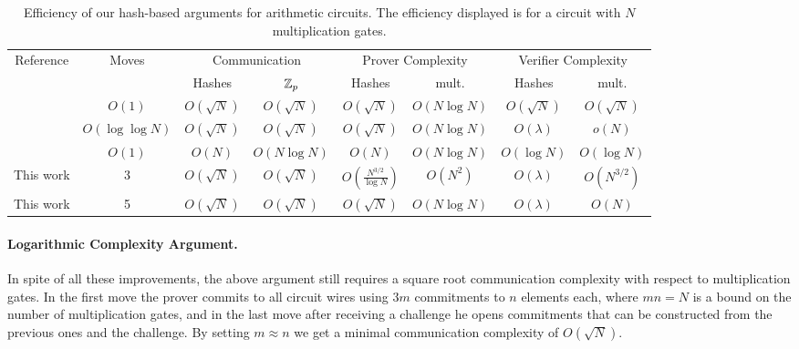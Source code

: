 \begin{table}
\vspace{20mm}
\centering
\begin{tabular}{|c|c|cc|cc|cc|}
\hline
Reference & Moves &\multicolumn{2}{c|}{ Communication}&\multicolumn{2}{c|}{Prover Complexity}&\multicolumn{2}{c|}{Verifier Complexity}\\
&& Hashes & $\mathbb{Z}_p$ & Hashes & mult. & Hashes & mult. \\
\hline
\cite{CCS:AHIV17}& $O(1)$& $O(\sqrt{N})$  & $O(\sqrt{N})$ & $O(\sqrt{N})$ & $O(N\log N)$& $O(\sqrt{N})$ & $O(\sqrt{N})$ \\
\cite{BootleCGGHJ17}& $O(\log \log N)$ &$O(\sqrt{N})$&$O(\sqrt{N})$&$O(\sqrt{N})$ &$O\left(N \log N\right)$&$O(\lambda)$&$o(N)$ \\
\cite{Ben-SassonBHR18}& $O(1)$ &$O(N)$&$O(N \log N)$&$O(N)$ & $O(N \log N)$ &  $O(\log N)$&$O(\log N)$\\
\hline
This work & 3& $O(\sqrt{N})$&$O(\sqrt{N})$&$O(\frac{N^{3/2}}{\log{N}})$& $O(N^2)$ &$O(\lambda)$ & $O(N^{3/2})$ \\
\hline
This work & 5& $O(\sqrt{N})$&$O(\sqrt{N})$&$O(\sqrt{N})$& $O(N \log{N})$ &$O(\lambda)$ & $O(N)$ \\
\hline
\end{tabular}
\vspace{.2cm}
\caption{Efficiency of our hash-based arguments for arithmetic circuits. The efficiency displayed is for a circuit with $N$ multiplication gates.\label{table:previous2}} 
\vspace{-.5cm}
\end{table}

\paragraph{Logarithmic Complexity Argument.}
In spite of all these improvements, the above argument still requires a square root communication complexity with respect to multiplication gates. In the first move the prover commits to all circuit wires using $3m$ commitments to $n$ elements each, where $mn=N$ is a bound on the number of multiplication gates, and in the last move after receiving a challenge he opens commitments that can be constructed from the previous ones and the challenge. By setting $m\approx n$ we get a minimal communication complexity of $O(\sqrt{N})$.

